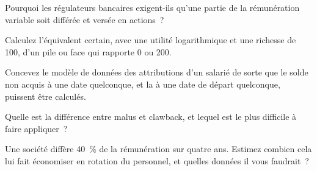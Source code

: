 \begin{interviewq}\label{iq:in:how-pay-works:2}
Pourquoi les régulateurs bancaires exigent-ils qu'une partie de la rémunération variable soit différée et versée en actions~?
\end{interviewq}

\begin{interviewq}\label{iq:in:how-pay-works:3}
Calculez l'équivalent certain, avec une utilité logarithmique et une richesse de 100, d'un pile ou face qui rapporte 0 ou 200.
\end{interviewq}

\begin{interviewq}\label{iq:in:how-pay-works:4}
Concevez le modèle de données des attributions d'un salarié de sorte que le solde non acquis à une date quelconque, et la
 à une date de départ quelconque, puissent être calculés.
\end{interviewq}

\begin{interviewq}\label{iq:in:how-pay-works:5}
Quelle est la différence entre malus et clawback, et lequel est le plus difficile à faire appliquer~?
\end{interviewq}

\begin{interviewq}\label{iq:in:how-pay-works:6}
Une société diffère 40~\% de la rémunération sur quatre ans. Estimez combien cela lui fait économiser en rotation du personnel, et quelles données il vous faudrait~?
\end{interviewq}

